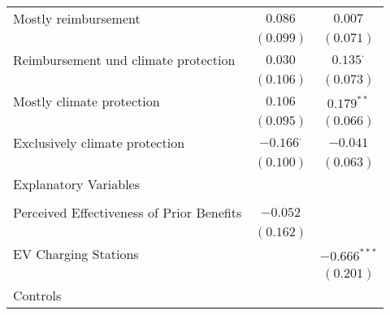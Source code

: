 \begin{center}
\begin{tiny}
\begin{longtable}{l@{} c@{} c@{}}
\quad Mostly reimbursement                                                                             & $0.086$          & $0.007$          \\
                                                                                                       & $(0.099)$        & $(0.071)$        \\
\quad Reimbursement und climate protection                                                             & $0.030$          & $0.135^{\cdot}$  \\
                                                                                                       & $(0.106)$        & $(0.073)$        \\
\quad Mostly climate protection                                                                        & $0.106$          & $0.179^{**}$     \\
                                                                                                       & $(0.095)$        & $(0.066)$        \\
\quad Exclusively climate protection                                                                   & $-0.166^{\cdot}$ & $-0.041$         \\
                                                                                                       & $(0.100)$        & $(0.063)$        \\
Explanatory Variables                                                                                  &                  &                  \\
                                                                                                       &                  &                  \\
\quad Perceived Effectiveness of Prior Benefits                                                        & $-0.052$         &                  \\
                                                                                                       & $(0.162)$        &                  \\
\quad EV Charging Stations                                                                             &                  & $-0.666^{***}$   \\
                                                                                                       &                  & $(0.201)$        \\
Controls                                                                                               &                  &                  \\

\end{longtable}
\end{tiny}
\end{center}
